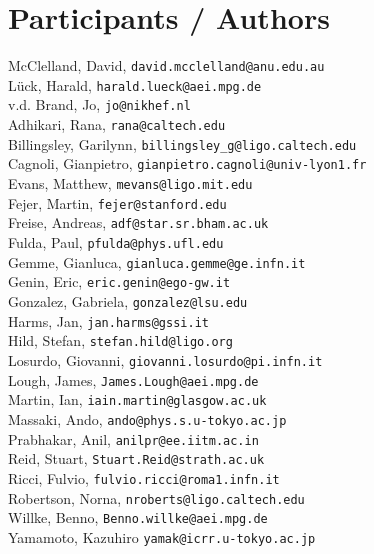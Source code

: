 \chapter{Participants / Authors}
\label{sec:Participants}


McClelland, David, \texttt{david.mcclelland@anu.edu.au}
\\
L\"uck, Harald,   \texttt{harald.lueck@aei.mpg.de} 
\\
v.d. Brand, Jo, \texttt{jo@nikhef.nl} 
\\
Adhikari, Rana, \texttt{rana@caltech.edu}
\\
Billingsley, Garilynn, \texttt{billingsley\_g@ligo.caltech.edu}
\\
Cagnoli, Gianpietro, \texttt{gianpietro.cagnoli@univ-lyon1.fr}
\\
Evans, Matthew, \texttt{mevans@ligo.mit.edu}
\\
Fejer, Martin, \texttt{fejer@stanford.edu}
\\
Freise, Andreas, \texttt{adf@star.sr.bham.ac.uk}
\\
Fulda, Paul, \texttt{pfulda@phys.ufl.edu}
\\
Gemme, Gianluca, \texttt{gianluca.gemme@ge.infn.it}
\\
Genin, Eric, \texttt{eric.genin@ego-gw.it}
\\
Gonzalez, Gabriela, \texttt{gonzalez@lsu.edu}
\\
Harms, Jan, \texttt{jan.harms@gssi.it}
\\
Hild, Stefan, \texttt{stefan.hild@ligo.org}
\\
Losurdo, Giovanni, \texttt{giovanni.losurdo@pi.infn.it}
\\
Lough, James, \texttt{James.Lough@aei.mpg.de}
\\
Martin, Ian, \texttt{iain.martin@glasgow.ac.uk}
\\
Massaki, Ando,  \texttt{ando@phys.s.u-tokyo.ac.jp}
\\
Prabhakar, Anil, \texttt{anilpr@ee.iitm.ac.in}
\\
Reid, Stuart, \texttt{Stuart.Reid@strath.ac.uk}
\\
Ricci, Fulvio, \texttt{fulvio.ricci@roma1.infn.it}
\\
Robertson, Norna, \texttt{nroberts@ligo.caltech.edu}
\\
Willke, Benno, \texttt{Benno.willke@aei.mpg.de}
\\
Yamamoto, Kazuhiro \texttt{yamak@icrr.u-tokyo.ac.jp}

